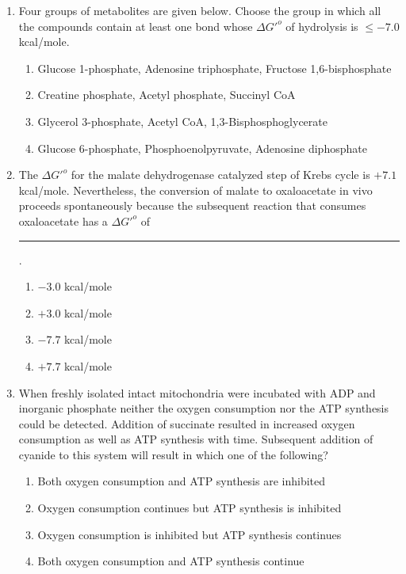 \documentclass[journal,12pt,onecolumn]{IEEEtran}
\begin{document}
\begin{enumerate}[label=\arabic*.,resume]

\item Four groups of metabolites are given below. Choose the group in which all the compounds contain at least one bond whose $\Delta G'^{o}$ of hydrolysis is $\leq -7.0$ kcal/mole.

\begin{enumerate}[label=(\Alph*)]
\item Glucose 1-phosphate, Adenosine triphosphate, Fructose 1,6-bisphosphate
\item Creatine phosphate, Acetyl phosphate, Succinyl CoA
\item Glycerol 3-phosphate, Acetyl CoA, 1,3-Bisphosphoglycerate
\item Glucose 6-phosphate, Phosphoenolpyruvate, Adenosine diphosphate
\end{enumerate}

\item The $\Delta G'^{o}$ for the malate dehydrogenase catalyzed step of Krebs cycle is $+7.1$ kcal/mole. Nevertheless, the conversion of malate to oxaloacetate in vivo proceeds spontaneously because the subsequent reaction that consumes oxaloacetate has a $\Delta G'^{o}$ of \rule{2.5cm}{0.1pt}.

\begin{multicols}{2}
\begin{enumerate}[label=(\Alph*)]
\item $-3.0$ kcal/mole
\item $+3.0$ kcal/mole
\item $-7.7$ kcal/mole
\item $+7.7$ kcal/mole
\end{enumerate}
\end{multicols}

\item When freshly isolated intact mitochondria were incubated with ADP and inorganic phosphate neither the oxygen consumption nor the ATP synthesis could be detected. Addition of succinate resulted in increased oxygen consumption as well as ATP synthesis with time. Subsequent addition of cyanide to this system will result in which one of the following?

\begin{enumerate}[label=(\Alph*)]
\item Both oxygen consumption and ATP synthesis are inhibited
\item Oxygen consumption continues but ATP synthesis is inhibited
\item Oxygen consumption is inhibited but ATP synthesis continues
\item Both oxygen consumption and ATP synthesis continue
\end{enumerate}


\end{enumerate}
\end{document}
